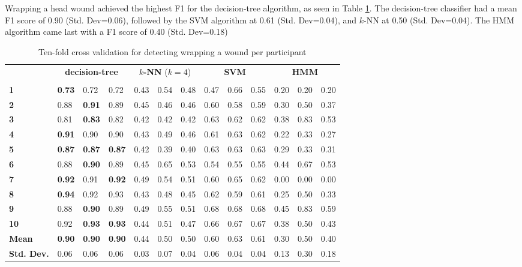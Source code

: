 \par Wrapping a head wound achieved the highest F1 for the decision-tree algorithm, as seen in Table \ref{tab:w:ml}. The decision-tree classifier had a mean F1 score of 0.90 (Std. Dev=0.06), followed by the SVM algorithm at 0.61 (Std. Dev=0.04), and $k$-NN at 0.50 (Std. Dev=0.04). The HMM algorithm came last with a F1 score of 0.40 (Std. Dev=0.18)
\begin{table}[]
	\centering
	\begin{tabular}{lllllllllllll}
		\multirow{2}{*}{\rotatebox[origin=c]{45}{\textbf{Participant}}} & \multicolumn{3}{c}{\textbf{decision-tree}} & \multicolumn{3}{c}{\textbf{$k$-NN} ($k=4$)} & \multicolumn{3}{c}{\textbf{SVM}} & \multicolumn{3}{c}{\textbf{HMM}} \\
		& \rot{Precision}     & \rot{Recall}    & \rot{F1}    & \rot{Precision}     & \rot{Recall}    & \rot{F1}  & \rot{Precision}     & \rot{Recall}    & \rot{F1} & \rot{Precision}     & \rot{Recall}    & \rot{F1} \\
		\textbf{1}   & \textbf{0.73} & 0.72 & 0.72 & 0.43 & 0.54 & 0.48 & 0.47 & 0.66 & 0.55 & 0.20 & 0.20 & 0.20 \\
		\textbf{2}   & 0.88 & \textbf{0.91} & 0.89 & 0.45 & 0.46 & 0.46 & 0.60 & 0.58 & 0.59 & 0.30 & 0.50 & 0.37 \\
		\textbf{3}   & 0.81 & \textbf{0.83} & 0.82 & 0.42 & 0.42 & 0.42 & 0.63 & 0.62 & 0.62 & 0.38 & 0.83 & 0.53 \\
		\textbf{4}   & \textbf{0.91} & 0.90 & 0.90 & 0.43 & 0.49 & 0.46 & 0.61 & 0.63 & 0.62 & 0.22 & 0.33 & 0.27 \\
		\textbf{5}   & \textbf{0.87} & \textbf{0.87} & \textbf{0.87} & 0.42 & 0.39 & 0.40 & 0.63 & 0.63 & 0.63 & 0.29 & 0.33 & 0.31 \\
		\textbf{6}   & 0.88 & \textbf{0.90} & 0.89 & 0.45 & 0.65 & 0.53 & 0.54 & 0.55 & 0.55 & 0.44 & 0.67 & 0.53 \\
		\textbf{7}   & \textbf{0.92} & 0.91 & \textbf{0.92} & 0.49 & 0.54 & 0.51 & 0.60 & 0.65 & 0.62 & 0.00 & 0.00 & 0.00 \\
		\textbf{8}   & \textbf{0.94} & 0.92 & 0.93 & 0.43 & 0.48 & 0.45 & 0.62 & 0.59 & 0.61 & 0.25 & 0.50 & 0.33 \\
		\textbf{9}   & 0.88 & \textbf{0.90} & 0.89 & 0.49 & 0.55 & 0.51 & 0.68 & 0.68 & 0.68 & 0.45 & 0.83 & 0.59 \\
		\textbf{10} & 0.92 & \textbf{0.93} & \textbf{0.93} & 0.44 & 0.51 & 0.47 & 0.66 & 0.67 & 0.67 & 0.38 & 0.50 & 0.43 \\
		\hline
		\textbf{Mean} & \textbf{0.90} & \textbf{0.90} & \textbf{0.90} & 0.44 & 0.50 & 0.50 & 0.60 & 0.63 & 0.61 & 0.30 & 0.50 & 0.40 \\
		\textbf{Std. Dev.} & 0.06 & 0.06 & 0.06 & 0.03 & 0.07 & 0.04 & 0.06 & 0.04 & 0.04 & 0.13 & 0.30 & 0.18
	\end{tabular}
	\caption{Ten-fold cross validation for detecting wrapping a wound per participant}
	\label{tab:w:ml}
\end{table}

